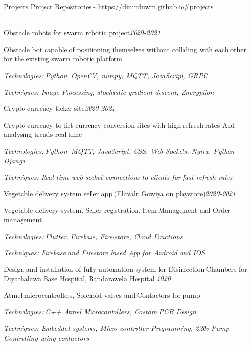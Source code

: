 \documentclass{resume} %
\begin{document}
\begin{rSection}{Projects}
\href{https://dininduwm.github.io#projects}{Project Repositories - https://dininduwm.github.io\#projects} \\ \\
\begin{rSubsection}{Obstacle robots for swarm robotic project}{\em {2020-2021}}{}{}
\item Obstacle bot capable of positioning themselves without colliding with each other for the existing swarm robotic platform. \item 
\textit{Technologies: Python, OpenCV, numpy, MQTT, JavaScript, GRPC}
\item \textit{Techniques: Image Processing, stochastic gradient descent, Encryption }
\end{rSubsection}

\begin{rSubsection}{Crypto currency ticker site}{\em {2020-2021}}{}{}
\item Crypto currency to fiet currency conversion sites with high refresh rates And analysing trends real time \item 
\textit{Technologies: Python, MQTT, JavaScript, CSS, Web Sockets, Nginx, Python Django}
\item \textit{Techniques: Real time web socket connections to clients for fast refresh rates}
\end{rSubsection}

\begin{rSubsection}{Vegetable delivery system seller app (Elavalu Gowiya on playstore)}{\em {2020-2021}}{}{}
\item Vegetable delivery system, Seller registration, Item Management and Order management \item 
\textit{Technologies: Flutter, Firebase, Fire-store, Cloud Functions}
\item \textit{Techniques: Firebase and Firestore based App for Android and IOS}
\end{rSubsection}

\begin{rSubsection}{Design and installation of fully automation system for Disinfection Chambers for Diyathalawa Base Hospital, Bandarawela Hospital }{\em {2020}}{}{}
\item Atmel microcontrollers, Solenoid valves and Contactors for pump \item 
\textit{Technologies: C++ Atmel Microcontollers, Costom PCB Design}
\item \textit{Techniques: Embedded systems, Micro controller Programming, 220v Pump Controlling using contactors}
\end{rSubsection}


\end{rSection}
\end{document}

